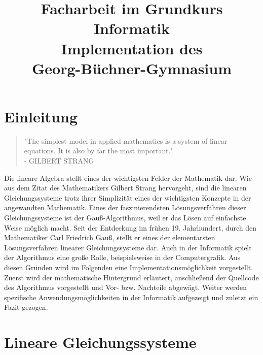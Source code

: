 \documentclass[a4paper, 12pt]{report}
\title{\LARGE Facharbeit im Grundkurs Informatik  \vspace*{0.5cm} \\
  \Huge Implementation des \GA \vspace*{0.5cm} \\
  \LARGE Georg-Büchner-Gymnasium}
\newcommand{\GA}{Gauß-Algorithmus}
\begin{document}
\maketitle
\tableofcontents

{\let\clearpage\relax \chapter{Einleitung}}
\begin{quote}
    "The simplest model in applied mathematics is a system of linear equations.
    It is also by far the most important." \\ - GILBERT STRANG
\end{quote}

Die lineare Algebra stellt eines der wichtigsten Felder der Mathematik dar. Wie aus dem Zitat des Mathematikers Gilbert Strang hervorgeht,
sind die linearen Gleichungssysteme trotz ihrer Simplizität eines der wichtigsten Konzepte in der angewandten Mathematik.
Eines der faszinierendsten Lösungsverfahren dieser Gleichungssysteme ist der \GA,
weil er das Lösen auf einfachste Weise möglich macht. Seit der Entdeckung im frühen 19. Jahrhundert, durch den
Mathematiker Carl Friedrich Gauß, stellt er eines der elementarsten Lösungsverfahren linearer Gleichungssysteme dar.
Auch in der Informatik spielt der Algorithmus eine große Rolle, beispielsweise in der Computergrafik. Aus diesen Gründen wird im Folgenden eine Implementationsmöglichkeit
vorgestellt. Zuerst wird der mathematische Hintergrund erläutert, anschließend der Quellcode des Algorithmus vorgestellt und
Vor- bzw. Nachteile abgewägt.
Weiter werden spezifische Anwendungsmöglichkeiten in der Informatik aufgezeigt und zuletzt ein Fazit gezogen.

\chapter{Lineare Gleichungssysteme}
\end{document}
